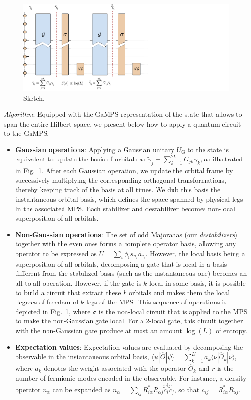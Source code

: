 \documentclass[a4paper, twocolumn, superscriptaddress, longbibliography]{revtex4-2}
\begin{document}
	\begin{figure}[t]
		\centering
		\includegraphics[width=1.\textwidth]{Figs/Sketch/Sketch_circuit.pdf}
		\caption{Sketch.}
		\label{fig:sketch}
	\end{figure}
	\emph{Algorithm}: Equipped with the GaMPS representation of the state that allows to span the entire Hilbert space, we present below how to apply a quantum circuit to the GaMPS.
	\begin{itemize}
		\item {\bf Gaussian operations}: Applying a Gaussian unitary $U_{\mathrm{G}}$ to the state is equivalent to update the basis of orbitals as $\tilde{\gamma}_j = \sum_{k=1}^{2L} G_{jk}\gamma_{k}$, as illustrated in Fig.~\ref{fig:sketch}. After each Gaussian operation, we update the orbital frame by successively multiplying the corresponding orthogonal transformations, thereby keeping track of the basis at all times. We dub this basis the instantaneous orbital basis, which defines the space spanned by physical legs in the associated MPS. Each stabilizer and destabilizer becomes non-local superposition of all orbitals. 
		\item {\bf Non-Gaussian operations}: The set of odd Majoranas (our \emph{destabilizers}) together with the even ones  forms a complete operator basis, allowing any operator to be expressed as $U = \sum_{i} \phi_{i} s_{u_i}d_{v_i}$. However, the local basis being a superposition of all orbitals, decomposing a gate that is local in a basis different from the stabilized basis (such as the instantaneous one) becomes an all-to-all operation. However, if the gate is $k$-local in some basis, it is possible to build a circuit that extract these $k$ orbitals and makes them the local degrees of freedom of $k$ legs of the MPS. This sequence of operations is depicted in Fig.~\ref{fig:sketch}, where $\sigma$ is the non-local circuit that is applied to the MPS to make the non-Gaussian gate local. For a $2$-local gate, this circuit together with the non-Gaussian gate produce at most an amount $\log(L)$ of entropy.
		\item {\bf Expectation values}: Expectation values are evaluated by decomposing the observable in the instantaneous orbital basis, $\langle \psi | \hat{O} | \psi \rangle = \sum_{k=1}^{L^{r}} a_{k}\langle \nu | \hat{O}_k | \nu \rangle$, where $a_k$ denotes the weight associated with the operator $\hat{O}_{k}$ and $r$ is the number of fermionic modes encoded in the observable. For instance, a density operator $n_\alpha$ can be expanded as $n_\alpha = \sum_{ij} R^{*}_{i\alpha} R_{\alpha j} \hat{\tilde{c}}^{\dagger}_{i}\hat{\tilde{c}}^{}_{j}$, so that $a_{ij} = R^{*}_{i\alpha} R_{\alpha j}$.
	\end{itemize}
	
\end{document}
